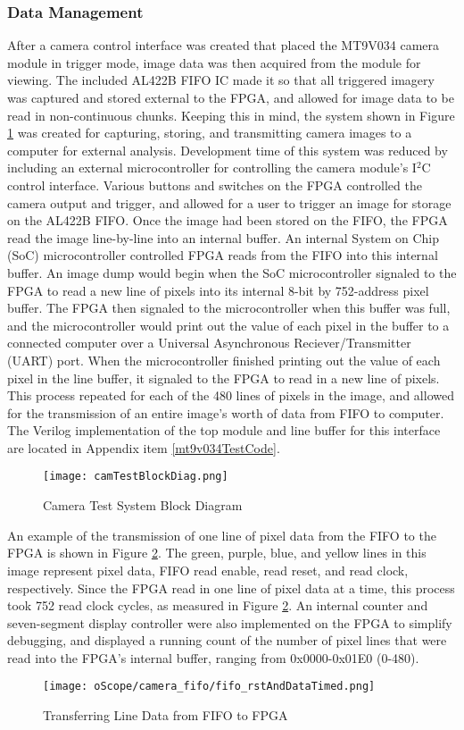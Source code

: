 \subsubsection{Data Management} 
After a camera control interface was created that placed the MT9V034 camera module in trigger mode, image data was then acquired from the module for viewing. The included AL422B FIFO IC made it so that all triggered imagery was captured and stored external to the FPGA, and allowed for image data to be read in non-continuous chunks. Keeping this in mind, the system shown in Figure \ref{camTestBDG} was created for capturing, storing, and transmitting camera images to a computer for external analysis. Development time of this system was reduced by including an external microcontroller for controlling the camera module's I$^2$C control interface. Various buttons and switches on the FPGA controlled the camera output and trigger, and allowed for a user to trigger an image for storage on the AL422B FIFO. Once the image had been stored on the FIFO, the FPGA read the image line-by-line into an internal buffer. An internal System on Chip (SoC) microcontroller controlled FPGA reads from the FIFO into this internal buffer. An image dump would begin when the SoC microcontroller signaled to the FPGA to read a new line of pixels into its internal 8-bit by 752-address pixel buffer. The FPGA then signaled to the microcontroller when this buffer was full, and the microcontroller would print out the value of each pixel in the buffer to a connected computer over a Universal Asynchronous Reciever/Transmitter (UART) port. When the microcontroller finished printing out the value of each pixel in the line buffer, it signaled to the FPGA to read in a new line of pixels. This process repeated for each of the 480 lines of pixels in the image, and allowed for the transmission of an entire image's worth of data from FIFO to computer. The Verilog implementation of the top module and line buffer for this interface are located in Appendix item \ref{mt9v034TestCode}.

\begin{figure}[H]
	\centerline{\texttt{[image: camTestBlockDiag.png]}}
	\caption{Camera Test System Block Diagram}
	\label{camTestBDG}
\end{figure}
\par
An example of the transmission of one line of pixel data from the FIFO to the FPGA is shown in Figure \ref{fifoDataOut}.  The green, purple, blue, and yellow lines in this image represent pixel data, FIFO read enable, read reset, and read clock, respectively. Since the FPGA read in one line of pixel data at a time, this process took 752 read clock cycles, as measured in Figure \ref{fifoDataOut}. An internal counter and seven-segment display controller were also implemented on the FPGA to simplify debugging, and displayed a running count of the number of pixel lines that were read into the FPGA's internal buffer, ranging from 0x0000-0x01E0 (0-480). 
\begin{figure}[H]
	\centerline{\texttt{[image: oScope/camera\_fifo/fifo\_rstAndDataTimed.png]}}
	\caption{Transferring Line Data from FIFO to FPGA}
	\label{fifoDataOut}
\end{figure}

